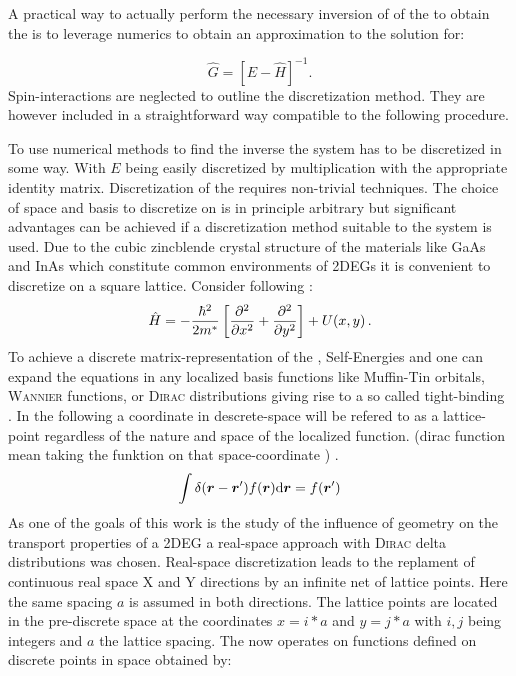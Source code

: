 A practical way to actually perform the necessary inversion of of the \hamil{} to obtain the \gfnc{} is to leverage numerics to obtain an approximation to the solution for:

\begin{equation}
	\hat{G} = \left[E-\hat{H} \right]^{-1}\text{.}
  \label{eqn:effectivemasshamiltonian}
\end{equation}
Spin-interactions are neglected to outline the discretization method. They are however included in a straightforward way compatible to the following procedure.

To use numerical methods to find the inverse the system has to be discretized in some way. With $E$ being easily discretized by multiplication with the appropriate identity matrix. Discretization of the \hamil{} requires non-trivial techniques. The choice of space and basis to discretize on is in principle arbitrary but significant advantages can be achieved if a discretization method suitable to the system is used.
Due to the cubic zincblende crystal structure of the materials like GaAs and InAs which constitute common environments of 2DEGs it is convenient to discretize on a square lattice.
Consider following \hamil{}:
\begin{equation}
  \hat{H}=-\frac{\hbar^{2}}{2m^*}\left[\frac{\partial^2 }{\partial x^2}+\frac{\partial^2 }{\partial y^2}\right]+U(x,y)\text{\,.}
    \label{eqn:Hamil}
\end{equation}
To achieve a discrete matrix-representation of the \hamil{}, Self-Energies and \gfnc{} one can expand the equations in any localized basis functions like Muffin-Tin orbitals, \textsc{Wannier} functions, or \textsc{Dirac} distributions giving rise to a so called tight-binding \hamil{}. In the following a coordinate in descrete-space will be refered to as a lattice-point regardless of the nature and space of the localized function.
(dirac function mean taking the funktion on that space-coordinate ) \cite{JApplPhys.92.3730}.
\begin{equation}
  \int \delta (\boldsymbol{r}-\boldsymbol{r}') f(\boldsymbol{r}) \mathrm{d}\boldsymbol{r} = f(\boldsymbol{r}')
  \label{eqn:deltabasis}
\end{equation}
As one of the goals of this work is the study of the influence of geometry on the transport properties of a 2DEG a real-space approach with \textsc{Dirac} delta distributions was chosen. Real-space discretization leads to the replament of continuous real space X and Y directions by an infinite net of lattice points. Here the same spacing $a$ is assumed in both directions. The lattice points are located in the pre-discrete space at the coordinates $x=i*a$ and $y=j*a$ with $i,j$ being integers and $a$ the lattice spacing. The \hamil{} now operates on functions defined on discrete points in space obtained by:
